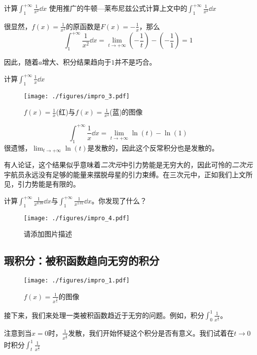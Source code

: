 \begin{example}{计算$\int^{+\infty}_1 \frac{1}{x^2} \dd x$}
使用推广的牛顿—莱布尼兹公式计算上文中的$\int^{+\infty}_1 \frac{1}{x^2} \dd x$

很显然，$f(x)=\frac{1}{x^2}$的原函数是$F(x)=-\frac{1}{x}$，那么
$$\int^{+\infty}_1 \frac{1}{x^2} \dd x=\lim_{t\rightarrow+\infty } (-\frac{1}{t}) - (-\frac{1}{1})=1$$

因此，随着$a$增大、积分结果趋向于$1$并不是巧合。
\end{example}

\begin{example}{计算$\int^{+\infty}_1 \frac{1}{x} \dd x$}
\begin{figure}[ht]
\centering
\texttt{[image: ./figures/impro\_3.pdf]}
\caption{$f(x) = \frac{1}{x}$(红)与$f(x) = \frac{1}{x^2}$(蓝)的图像} \label{impro_fig3}
\end{figure}

$$\int^{+\infty}_1 \frac{1}{x} \dd x=\lim_{t\rightarrow+\infty } {\ln(t)} - \ln(1)$$
很遗憾，$\lim_{t\rightarrow+\infty } {\ln(t)} $是发散的，因此这个反常积分也是发散的。

有人论证，这个结果似乎意味着\textsl{二次元}中引力势能是无穷大的，因此可怜的\textsl{二次元}宇航员永远没有足够的能量来摆脱母星的引力束缚。在三次元中，正如我们上文所见，引力势能是有限的。

\end{example}

\begin{exercise}{}
计算$\int^{+\infty}_1 \frac{1}{x^{0.99}} \dd x$与$\int^{+\infty}_1 \frac{1}{x^{1.01}} \dd x$。你发现了什么？
\begin{figure}[ht]
\centering
\texttt{[image: ./figures/impro\_4.pdf]}
\caption{请添加图片描述} \label{impro_fig4}
\end{figure}
\end{exercise}

\subsection{瑕积分：被积函数趋向无穷的积分}
\begin{figure}[ht]
\centering
\texttt{[image: ./figures/impro\_1.pdf]}
\caption{$f(x)=\frac{1}{x^{\frac{4}{5}}}$的图像} \label{impro_fig1}
\end{figure}
接下来，我们来处理一类被积函数趋近于无穷的问题。例如，积分$\int_0^1 \frac{1}{x^{\frac{4}{5}}}$。

注意到当$x=0$时，$\frac{1}{x^{\frac{4}{5}}}$发散，我们开始怀疑这个积分是否有意义。我们试着在$t\to0$时积分$\int_t^1 \frac{1}{x^{\frac{4}{5}}}$

